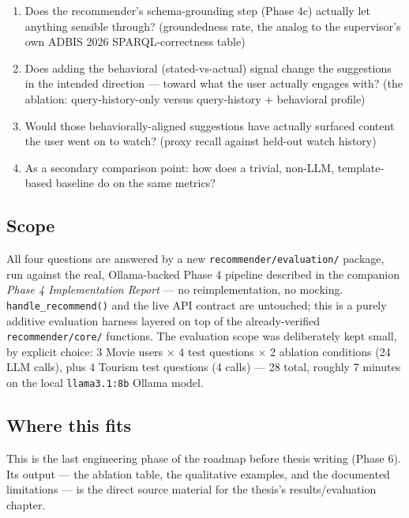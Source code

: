 \documentclass[11pt,a4paper]{article}
\newcommand{\code}[1]{\texttt{#1}}
\begin{document}
\begin{enumerate}
    \item Does the recommender's schema-grounding step (Phase 4c) actually let anything sensible
        through? (groundedness rate, the analog to the supervisor's own ADBIS 2026
        SPARQL-correctness table)
    \item Does adding the behavioral (stated-vs-actual) signal change the suggestions in the
        intended direction --- toward what the user actually engages with? (the ablation:
        query-history-only versus query-history + behavioral profile)
    \item Would those behaviorally-aligned suggestions have actually surfaced content the user went
        on to watch? (proxy recall against held-out watch history)
    \item As a secondary comparison point: how does a trivial, non-LLM, template-based baseline do
        on the same metrics?
\end{enumerate}

\subsection{Scope}

All four questions are answered by a new \code{recommender/evaluation/} package, run against the
real, Ollama-backed Phase 4 pipeline described in the companion \emph{Phase 4 Implementation
Report} --- no reimplementation, no mocking. \code{handle\_recommend()} and the live API contract
are untouched; this is a purely additive evaluation harness layered on top of the already-verified
\code{recommender/core/} functions. The evaluation scope was deliberately kept small, by explicit
choice: 3 Movie users $\times$ 4 test questions $\times$ 2 ablation conditions (24 LLM calls), plus
4 Tourism test questions (4 calls) --- 28 total, roughly 7 minutes on the local \code{llama3.1:8b}
Ollama model.

\subsection{Where this fits}

This is the last engineering phase of the roadmap before thesis writing (Phase 6). Its output ---
the ablation table, the qualitative examples, and the documented limitations --- is the direct
source material for the thesis's results/evaluation chapter.

\newpage
\end{document}
